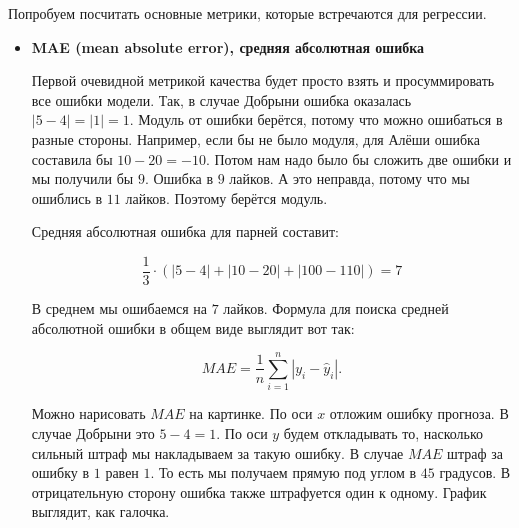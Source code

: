\documentclass[12pt, a4paper, oneside]{article}
\theoremstyle{plain} %
\theoremstyle{definition}
\newcommand{\indef}[1]{\textbf{ \color{green} #1}}
\begin{document}
\begin{solution}
Попробуем посчитать основные метрики, которые встречаются для регрессии. 
\begin{itemize}
	\item \indef{MAE (mean absolute error), средняя абсолютная ошибка}
	
	Первой очевидной метрикой качества будет просто взять и просуммировать все ошибки модели. Так, в случае Добрыни ошибка оказалась $|5 - 4| = |1| = 1$. Модуль от ошибки берётся, потому что можно ошибаться в разные стороны. Например, если бы не было модуля, для Алёши ошибка составила бы $10 - 20 = -10$. Потом нам надо было бы сложить две ошибки и мы получили бы $9$. Ошибка в $9$ лайков. А это неправда, потому что мы ошиблись в $11$ лайков. Поэтому берётся модуль. 
	
	Средняя абсолютная ошибка для парней составит: 
	
	$$ 
	\frac{1}{3} \cdot (|5 - 4| + |10 - 20| + |100 - 110|) = 7
	$$
	
	В среднем мы ошибаемся на $7$ лайков. Формула для поиска средней абсолютной ошибки в общем виде выглядит вот так: 
	
	$$
	MAE = \frac{1}{n}\sum_{i=1}^{n} |y_i - \hat{y}_i|.
	$$
	 
	 Можно нарисовать $MAE$ на картинке. По оси $x$ отложим ошибку прогноза. В случае Добрыни это $5-4 = 1$. По оси $y$ будем откладывать то, насколько сильный штраф мы накладываем за такую ошибку. В случае $MAE$ штраф за ошибку в $1$ равен $1$. То есть мы получаем прямую под углом в $45$ градусов. В отрицательную сторону ошибка также штрафуется один к одному. График выглядит, как галочка. 

\begin{center}
\end{center}
\end{itemize}
\end{solution}
\end{document}
